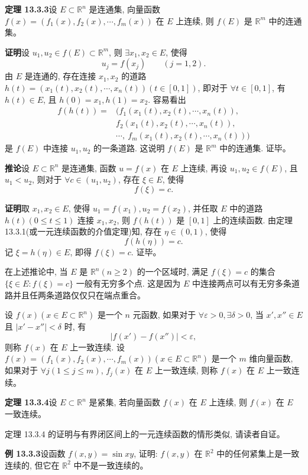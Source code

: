 \documentclass[UTF8, 12pt, fontset=fandol, oneside]{ctexart}
\begin{document}
\noindent\textbf{定理 13.3.3}\quad 设 $E\subset\mathbb R^n$ 是连通集, 向量函数 $f(x)=(f_1(x),f_2(x),\cdots,f_m(x))$ 在 $E$ 上连续, 则 $f(E)$ 是 $\mathbb R^m$ 中的连通集。

\noindent\textbf{证明}\quad 设 $u_1,u_2\in f(E)\subset\mathbb R^m$, 则 $\exists x_1,x_2\in E$, 使得
\[
  u_j=f(x_j)\qquad (j=1,2).
\]
由 $E$ 是连通的, 存在连接 $x_1,x_2$ 的道路 $h(t)=(x_1(t),x_2(t),\cdots,x_n(t))(t\in[0,1])$, 即对于 $\forall t\in[0,1]$, 有 $h(t)\in E$, 且 $h(0)=x_1,h(1)=x_2$. 容易看出
\[
\begin{aligned}
  f(h(t))={}&(f_1(x_1(t),x_2(t),\cdots,x_n(t)),\\
  &f_2(x_1(t),x_2(t),\cdots,x_n(t)),\\
  &\cdots,\ f_m(x_1(t),x_2(t),\cdots,x_n(t)))
\end{aligned}
\]
是 $f(E)$ 中连接 $u_1,u_2$ 的一条道路. 这说明 $f(E)$ 是 $\mathbb R^m$ 中的连通集. 证毕。

\noindent\textbf{推论}\quad 设 $E\subset\mathbb R^n$ 是连通集, 函数 $u=f(x)$ 在 $E$ 上连续, 再设 $u_1,u_2\in f(E)$, 且 $u_1<u_2$, 则对于 $\forall c\in(u_1,u_2)$, 存在 $\xi\in E$, 使得
\[
  f(\xi)=c.
\]

\noindent\textbf{证明}\quad 取 $x_1,x_2\in E$, 使得 $u_1=f(x_1),u_2=f(x_2)$, 并任取 $E$ 中的道路 $h(t)(0\leqslant t\leqslant1)$ 连接 $x_1,x_2$, 则 $f(h(t))$ 是 $[0,1]$ 上的连续函数. 由定理 13.3.1(或一元连续函数的介值定理)知, 存在 $\eta\in(0,1)$, 使得
\[
  f(h(\eta))=c.
\]
记 $\xi=h(\eta)\in E$, 即得 $f(\xi)=c$. 证毕。

在上述推论中, 当 $E$ 是 $\mathbb R^n(n\geqslant2)$ 的一个区域时, 满足 $f(\xi)=c$ 的集合 $\{\xi\in E:f(\xi)=c\}$ 一般有无穷多个点. 这是因为 $E$ 中连接两点可以有无穷多条道路并且任两条道路仅仅只在端点重合。

设 $f(x)(x\in E\subset\mathbb R^n)$ 是一个 $n$ 元函数, 如果对于 $\forall\varepsilon>0,\exists\delta>0$, 当 $x',x''\in E$ 且 $|x'-x''|<\delta$ 时, 有
\[
  |f(x')-f(x'')|<\varepsilon,
\]
则称 $f(x)$ 在 $E$ 上一致连续. 设 $f(x)=(f_1(x),f_2(x),\cdots,f_m(x))(x\in E\subset\mathbb R^n)$ 是一个 $m$ 维向量函数, 如果对于 $\forall j(1\leqslant j\leqslant m)$, $f_j(x)$ 在 $E$ 上一致连续, 则称 $f(x)$ 在 $E$ 上一致连续。

\noindent\textbf{定理 13.3.4}\quad 设 $E\subset\mathbb R^n$ 是紧集, 若向量函数 $f(x)$ 在 $E$ 上连续, 则 $f(x)$ 在 $E$ 一致连续。

定理 13.3.4 的证明与有界闭区间上的一元连续函数的情形类似, 请读者自证。

\noindent\textbf{例 13.3.3}\quad 设函数 $f(x,y)=\sin xy$, 证明: $f(x,y)$ 在 $\mathbb R^2$ 中的任何紧集上是一致连续的, 但它在 $\mathbb R^2$ 中不是一致连续的。
\end{document}
